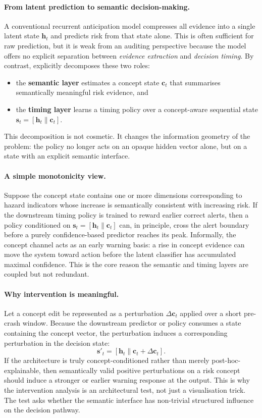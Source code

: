 \paragraph{From latent prediction to semantic decision-making.}
A conventional recurrent anticipation model compresses all evidence into a
single latent state $\mathbf{h}_t$ and predicts risk from that state alone.
This is often sufficient for raw prediction, but it is weak from an auditing
perspective because the model offers no explicit separation between
\emph{evidence extraction} and \emph{decision timing}. By contrast, \method{}
explicitly decomposes these two roles:
\begin{itemize}[leftmargin=1.5em]
  \item the \textbf{semantic layer} estimates a concept state $\mathbf{c}_t$ that
  summarises semantically meaningful risk evidence, and
  \item the \textbf{timing layer} learns a timing policy over a concept-aware
  sequential state $\mathbf{s}_t=[\mathbf{h}_t\|\mathbf{c}_t]$.
\end{itemize}
This decomposition is not cosmetic. It changes the information geometry of the
problem: the policy no longer acts on an opaque hidden vector alone, but on a
state with an explicit semantic interface.

\paragraph{A simple monotonicity view.}
Suppose the concept state contains one or more dimensions corresponding to
hazard indicators whose increase is semantically consistent with increasing
risk. If the downstream timing policy is trained to reward earlier correct
alerts, then a policy conditioned on $\mathbf{s}_t=[\mathbf{h}_t\|\mathbf{c}_t]$
can, in principle, cross the alert boundary before a purely confidence-based
predictor reaches its peak. Informally, the concept channel acts as an early
warning basis: a rise in concept evidence can move the system toward action
before the latent classifier has accumulated maximal confidence. This is the
core reason the semantic and timing layers are coupled but not redundant.

\paragraph{Why intervention is meaningful.}
Let a concept edit be represented as a perturbation
$\Delta\mathbf{c}_t$ applied over a short pre-crash window.
Because the downstream predictor or policy consumes a state containing the
concept vector, the perturbation induces a corresponding perturbation in the
decision state:
\[
\mathbf{s}'_t = [\mathbf{h}_t\|\mathbf{c}_t + \Delta\mathbf{c}_t].
\]
If the architecture is truly concept-conditioned rather than merely
post-hoc-explainable, then semantically valid positive perturbations on a risk
concept should induce a stronger or earlier warning response at the output.
This is why the intervention analysis is an architectural test, not just a
visualisation trick. The test asks whether the semantic interface has
non-trivial structured influence on the decision pathway.


